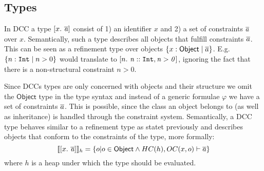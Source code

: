 \documentclass[a4paper]{article}
\begin{document}
\subsection{Types}
%
In DCC a type $[x.\ \mathit{\overline{a}}]$ consist of
1) an identifier $x$ and
2) a set of constraints $\overline{a}$ over $x$.
Semantically, such a type describes all objects
that fulfill constraints $\overline{a}$.
This can be seen as a refinement type over objects
$\{x:\mathsf{Object} \mid \overline{a}\}$.
E.g. $\{n:\mathtt{Int} \mid n>0\}$ would translate to
$[n.\ \mathit{\mathit{n} :: \mathit{\mathtt{Int}, n>0}}]$,
ignoring the fact that there is a non-structural constraint $n>0$.

Since DCCs types are only concerned with objects and their structure
we omit the $\mathsf{Object}$ type in the type syntax
and instead of a generic formulae $\varphi$
we have a set of constraints $\overline{a}$.
This is possible, since the class an object belongs to (as well as inheritance)
is handled through the constraint system.
Semantically, a DCC type behaves similar to a refinement type as statet previously and
describes objects that conform to the constraints of the type,
more formally:
\[
  \llbracket[x.\ \mathit{\overline{a}}]\rrbracket_{h} = 
    \{ o | o \in \mathsf{Object} \land HC(h), OC(x,o) \vdash \overline{a} \}
\]
where $h$ is a heap under which the type should be evaluated.
\end{document}
